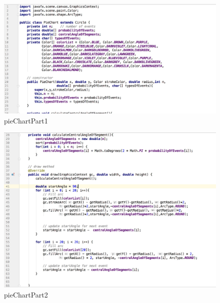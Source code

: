 \documentclass[a4paper,12pt]{article}
\begin{document}
\begin{figure}[H]
   \centering
   \includegraphics[width = 17cm]{pieChartPart1} %
   \caption{pieChartPart1}
   \label{pieChartPart1}
\end{figure}



\begin{figure}[H]
   \centering
   \includegraphics[width = 17cm]{pieChartPart2} %
   \caption{pieChartPart2}
   \label{pieChartPart2}
\end{figure}
\end{document}
